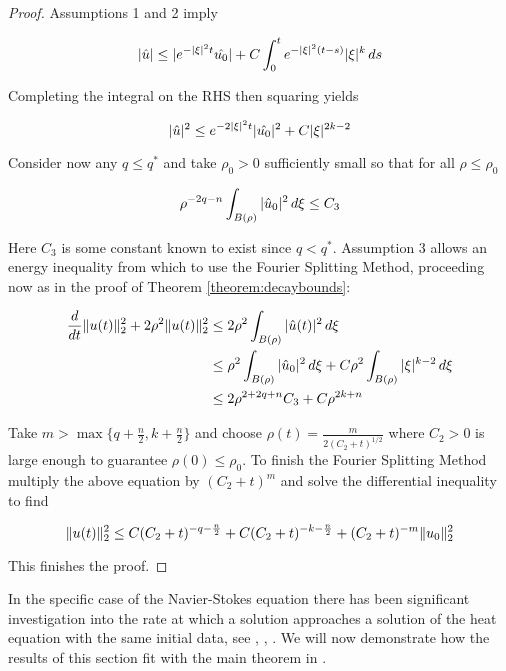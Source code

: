 \documentclass{amsart}
\numberwithin{Theorem}{section}
\numberwithin{equation}{section}
\theoremstyle{definition}
\theoremstyle{remark}
\begin{document}
\begin{proof}

Assumptions 1 and 2 imply

\begin{equation}
|\hat{u}|\leq |e^{-|\xi|^2t}\hat{u_0}| + C\int_0^te^{-|\xi|^2(t-s)}|\xi|^k\,ds\notag
\end{equation}

Completing the integral on the RHS then squaring yields

\begin{equation}
|\hat{u}|^2\leq e^{-2|\xi|^2t}|\hat{u_0}|^2 + C|\xi|^{2k-2}\notag
\end{equation}

Consider now any $q\leq q^*$ and take $\rho_0>0$ sufficiently small so that for all $\rho\leq\rho_0$

\begin{equation}
\rho^{-2q-n}\int_{B(\rho)}|\hat{u}_0|^2\,d\xi\leq C_3\notag
\end{equation}

Here $C_3$ is some constant known to exist since $q<q^*$.  Assumption 3 allows an energy inequality from which to use the Fourier Splitting Method, proceeding now as in the proof of Theorem \ref{theorem:decaybounds}:

\begin{align}
\frac{d}{dt}\|u(t)\|_2^2 +2\rho^2\|u(t)\|_2^2 &\leq 2\rho^2\int_{B(\rho)}|\hat{u}(t)|^2\,d\xi\notag\\
&\leq \rho^2\int_{B(\rho)}|\hat{u}_0|^2\,d\xi + C\rho^2\int_{B(\rho)}|\xi|^{k-2}\,d\xi\notag\\
&\leq 2\rho^{2+2q+n}C_3 + C\rho^{2k+n}\notag
\end{align}

Take $m>\max\{q+\frac{n}{2},k+\frac{n}{2}\}$ and choose $\rho(t)=\frac{m}{2(C_2+t)^{1/2}}$ where $C_2>0$ is large enough to guarantee $\rho(0)\leq \rho_0$. To finish the Fourier Splitting Method multiply the above equation by $(C_2+t)^m$ and solve the differential inequality to find

\begin{equation}
\|u(t)\|_2^2\leq C(C_2+t)^{-q-\frac{n}{2}}+C(C_2+t)^{-k-\frac{n}{2}}+(C_2+t)^{-m}\|u_0\|_2^2\notag
\end{equation}

This finishes the proof.

\end{proof}

In the specific case of the Navier-Stokes equation there has been
significant investigation into the rate at which a solution
approaches a solution of the heat equation with the same initial
data, see \cite{Carpio}, \cite{Miyakawa}, \cite{W}.  We will now
demonstrate how the results of this section fit with the main theorem in
\cite{W}.
\end{document}
